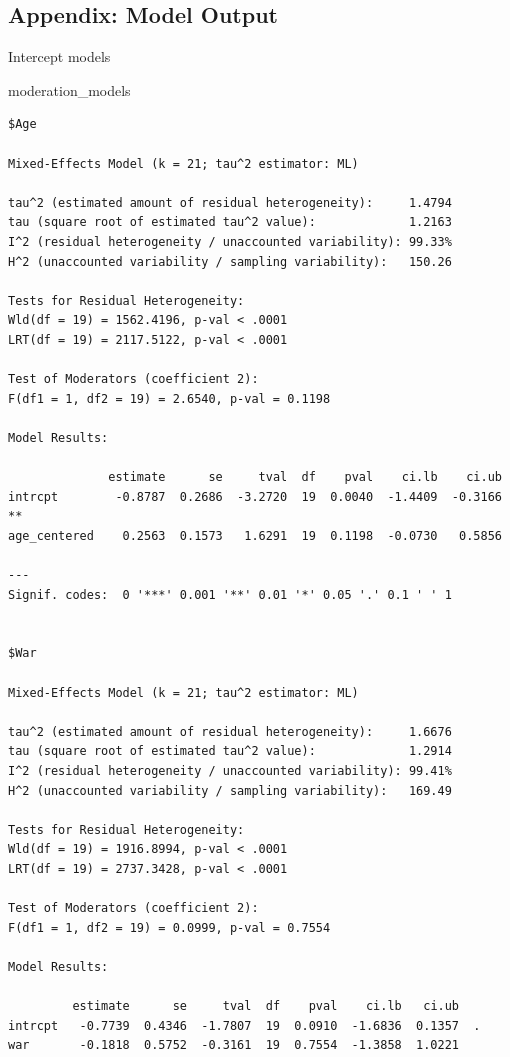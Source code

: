 \documentclass[
  letterpaper,
  DIV=11,
  numbers=noendperiod]{scrartcl}
\newenvironment{Shaded}{\begin{snugshade}}{\end{snugshade}}
\newcommand{\NormalTok}[1]{\textcolor[rgb]{0.00,0.23,0.31}{#1}}
\begin{document}
\subsection{Appendix: Model Output}\label{appendix-model-output}

Intercept models

\begin{Shaded}
\begin{Highlighting}[]
\NormalTok{moderation\_models}
\end{Highlighting}
\end{Shaded}

\begin{verbatim}
$Age

Mixed-Effects Model (k = 21; tau^2 estimator: ML)

tau^2 (estimated amount of residual heterogeneity):     1.4794
tau (square root of estimated tau^2 value):             1.2163
I^2 (residual heterogeneity / unaccounted variability): 99.33%
H^2 (unaccounted variability / sampling variability):   150.26

Tests for Residual Heterogeneity:
Wld(df = 19) = 1562.4196, p-val < .0001
LRT(df = 19) = 2117.5122, p-val < .0001

Test of Moderators (coefficient 2):
F(df1 = 1, df2 = 19) = 2.6540, p-val = 0.1198

Model Results:

              estimate      se     tval  df    pval    ci.lb    ci.ub     
intrcpt        -0.8787  0.2686  -3.2720  19  0.0040  -1.4409  -0.3166  ** 
age_centered    0.2563  0.1573   1.6291  19  0.1198  -0.0730   0.5856     

---
Signif. codes:  0 '***' 0.001 '**' 0.01 '*' 0.05 '.' 0.1 ' ' 1


$War

Mixed-Effects Model (k = 21; tau^2 estimator: ML)

tau^2 (estimated amount of residual heterogeneity):     1.6676
tau (square root of estimated tau^2 value):             1.2914
I^2 (residual heterogeneity / unaccounted variability): 99.41%
H^2 (unaccounted variability / sampling variability):   169.49

Tests for Residual Heterogeneity:
Wld(df = 19) = 1916.8994, p-val < .0001
LRT(df = 19) = 2737.3428, p-val < .0001

Test of Moderators (coefficient 2):
F(df1 = 1, df2 = 19) = 0.0999, p-val = 0.7554

Model Results:

         estimate      se     tval  df    pval    ci.lb   ci.ub    
intrcpt   -0.7739  0.4346  -1.7807  19  0.0910  -1.6836  0.1357  . 
war       -0.1818  0.5752  -0.3161  19  0.7554  -1.3858  1.0221    


\end{verbatim}
\end{document}
